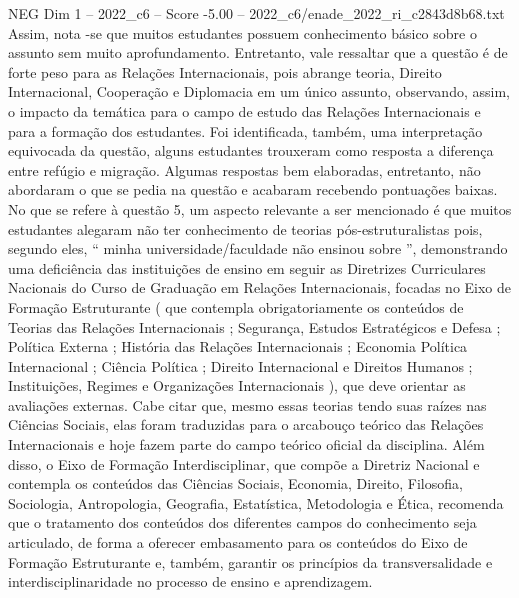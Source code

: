 \begin{textsample}{NEG Dim 1 – 2022\_c6 – Score -5.00 – 2022\_c6/enade\_2022\_ri\_c2843d8b68.txt}
Assim, nota -se que muitos estudantes possuem conhecimento básico sobre o assunto sem muito aprofundamento.
Entretanto, vale ressaltar que a questão é de forte peso para as Relações Internacionais, pois abrange teoria, Direito Internacional, Cooperação e Diplomacia em um único assunto, observando, assim, o impacto da temática para o campo de estudo das Relações Internacionais e para a formação dos estudantes.
Foi identificada, também, uma interpretação equivocada da questão, alguns estudantes trouxeram como resposta a diferença entre refúgio e migração.
Algumas respostas bem elaboradas, entretanto, não abordaram o que se pedia na questão e acabaram recebendo pontuações baixas.
No que se refere à questão 5, um aspecto relevante a ser mencionado é que muitos estudantes alegaram não ter conhecimento de teorias pós-estruturalistas pois, segundo eles, “ minha universidade/faculdade não ensinou sobre ”, demonstrando uma deficiência das instituições de ensino em seguir as Diretrizes Curriculares Nacionais do Curso de Graduação em Relações Internacionais, focadas no Eixo de Formação Estruturante ( que contempla obrigatoriamente os conteúdos de Teorias das Relações Internacionais ; Segurança, Estudos Estratégicos e Defesa ; Política Externa ; História das Relações Internacionais ; Economia Política Internacional ; Ciência Política ; Direito Internacional e Direitos Humanos ; Instituições, Regimes e Organizações Internacionais ), que deve orientar as avaliações externas.
Cabe citar que, mesmo essas teorias tendo suas raízes nas Ciências Sociais, elas foram traduzidas para o arcabouço teórico das Relações Internacionais e hoje fazem parte do campo teórico oficial da disciplina.
Além disso, o Eixo de Formação Interdisciplinar, que compõe a Diretriz Nacional e contempla os conteúdos das Ciências Sociais, Economia, Direito, Filosofia, Sociologia, Antropologia, Geografia, Estatística, Metodologia e Ética, recomenda que o tratamento dos conteúdos dos diferentes campos do conhecimento seja articulado, de forma a oferecer embasamento para os conteúdos do Eixo de Formação Estruturante e, também, garantir os princípios da transversalidade e interdisciplinaridade no processo de ensino e aprendizagem.

\end{textsample}
